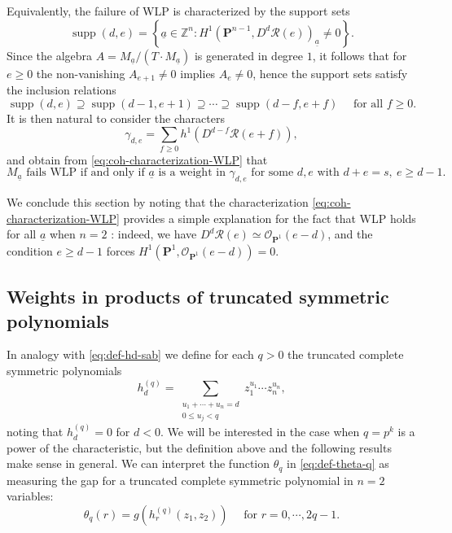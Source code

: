 \documentclass[11pt,reqno]{amsart}
\newcommand{\defi}[1]{{\upshape\sffamily #1}}
\newcommand{\bb}[1]{\mathbb{#1}}
\newcommand{\mc}[1]{\mathcal{#1}}
\newcommand{\op}[1]{\operatorname{#1}}
\newcommand{\ul}[1]{\underline{#1}}
\def\PP{{\mathbf P}}
\theoremstyle{definition}
\theoremstyle{remark}
\numberwithin{equation}{section}
\begin{document}
Equivalently, the failure of WLP is characterized by the \defi{support sets}
\begin{equation}\label{eq:def-supp-d-e} \op{supp}(d,e) = \left\{ \ul{a}\in\bb{Z}^n : H^1\left(\PP^{n-1},D^d\mc{R}(e)\right)_{\ul{a}} \neq 0\right\}.
\end{equation}
Since the algebra $A=M_{\ul{a}}/(T\cdot M_{\ul{a}})$ is generated in degree $1$, it follows that for $e\geq 0$ the non-vanishing $A_{e+1}\neq 0$ implies $A_e\neq 0$, hence the support sets satisfy the inclusion relations
\begin{equation}\label{eq:incl-supp-de}
    \op{supp}(d,e) \supseteq \op{supp}(d-1,e+1) \supseteq \cdots \supseteq \op{supp}(d-f,e+f)\quad\text{ for all }f\geq 0.
\end{equation}
It is then natural to consider the characters
\begin{equation}\label{eq:def-gamma}
    \gamma_{d,e} = \sum_{f\geq 0}h^1(D^{d-f}\mc{R}(e+f)),
\end{equation}
and obtain from \eqref{eq:coh-characterization-WLP} that
\begin{equation}\label{eq:WLP-from-gamma}
\text{$M_{\ul{a}}$ fails WLP if and only if $\ul{a}$ is a weight in } \gamma_{d,e}\text{ for some }d,e\text{ with }d+e=s,\ e\geq d-1.
\end{equation}
    
We conclude this section by noting that the characterization \eqref{eq:coh-characterization-WLP} provides a simple explanation for the fact that WLP holds for all $\ul{a}$ when $n=2$ \cites{HMNW,MZ}: indeed, we have $D^d\mc{R}(e) \simeq \mc{O}_{\PP^1}(e-d)$, and the condition $e\geq d-1$ forces $H^1(\PP^1,\mc{O}_{\PP^1}(e-d))=0$.

\subsection{Weights in products of truncated symmetric polynomials}
\label{subsec:tensor-truncated}

In analogy with \eqref{eq:def-hd-sab} we define for each $q>0$ the \defi{truncated complete symmetric polynomials}
\begin{equation}\label{eq:def-trunc-hd}
h^{(q)}_d = \sum_{\substack{u_1+\cdots+u_n=d \\ 0\leq u_j<q}} z_1^{u_1}\cdots z_n^{u_n},
\end{equation}
noting that $h^{(q)}_d=0$ for $d<0$. We will be interested in the case when $q=p^k$ is a power of the characteristic, but the definition above and the following results make sense in general. We can interpret the function $\theta_q$ in \eqref{eq:def-theta-q} as measuring the gap for a truncated complete symmetric polynomial in $n=2$ variables:
\[\theta_q(r) = g\left(h^{(q)}_r(z_1,z_2)\right)\quad\text{ for }r=0,\cdots,2q-1.\]
\end{document}
